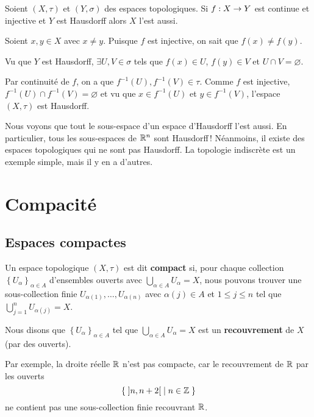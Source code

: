 \documentclass[french]{article}
\begin{document}
\begin{propo}
  Soient $(X, \tau)$ et $(Y, \sigma)$ des espaces topologiques. Si $f: X \rightarrow Y$ est continue et injective et $Y$ est Hausdorff alors $X$ l'est aussi.

  \tcblower
  \begin{preuve}
    Soient $x, y \in X$ avec $x \not = y$. Puisque $f$ est injective, on sait que $f(x) \not = f(y)$.
    \par Vu que  $Y$ est Hausdorff, $\exists U, V \in \sigma$ tels que $f(x) \in U$, $f(y) \in V$ et $U \cap V = \varnothing$.
    \par Par continuité de $f$, on a que  $f^{-1}(U), f^{-1}(V) \in \tau$. Comme $f$ est injective, $f^{-1}(U) \cap f^{-1}(V) = \varnothing$ et vu que $x \in f^{-1}(U)$ et $y \in f^{-1}(V)$, l'espace $(X, \tau)$ est Hausdorff.
  \end{preuve}
\end{propo}

Nous voyons que tout le sous-espace d’un espace d'Hausdorff l’est aussi. En particulier, tous les sous-espaces de $\mathbb{R}^n$ sont Hausdorff ! Néanmoins, il existe des espaces topologiques qui ne sont pas Hausdorff. La topologie indiscrète est un exemple simple, mais il y en a d’autres.

\section{Compacité}
\subsection{Espaces compactes}

\begin{definition}
  Un espace topologique $(X, \tau)$ est dit \textbf{compact} si, pour chaque collection $\left\{ U_\alpha \right\}_{\alpha \in A}$ d'ensembles ouverts avec $\bigcup\limits_{\alpha \in A}U_\alpha = X$, nous pouvons trouver une sous-collection finie $U_{\alpha(1)}, \dots, U_{\alpha(n)}$ avec  $\alpha(j) \in A$ et $1 \leq j \leq n$ tel que  $\bigcup\limits_{j=1}^n U_{\alpha(j)} = X$.
  \par Nous disons que $\left\{ U_\alpha \right\}_{\alpha \in A}$ tel que $\bigcup\limits_{\alpha \in A} U_\alpha = X$ est un \textbf{recouvrement} de $X$ (par des ouverts).
\end{definition}

Par exemple, la droite réelle $\mathbb{R}$ n'est pas compacte, car le recouvrement de  $\mathbb{R}$ par les ouverts
$$\left\{\; ]n, n+2[ \; \mid n \in \mathbb{Z} \; \right\}$$ 
ne contient pas une sous-collection finie recouvrant $\mathbb{R}$.
\end{document}
